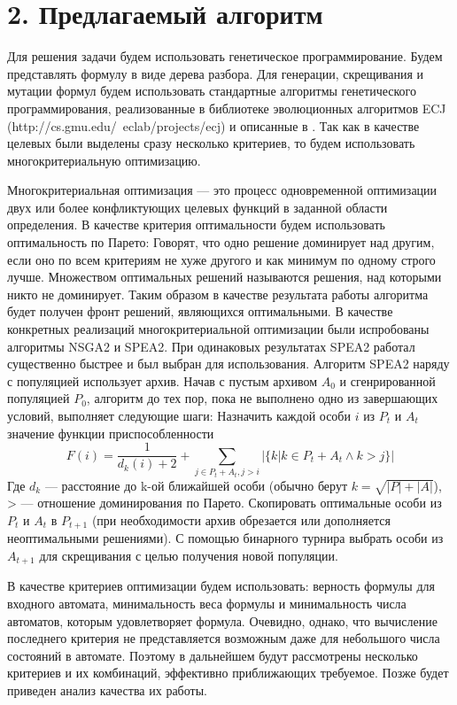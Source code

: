 \documentclass[12pt,fleqn]{article}
\begin{document}
\section{2. Предлагаемый алгоритм}

Для решения задачи будем использовать генетическое программирование\cite{kz1}. Будем представлять формулу в виде дерева разбора.
Для генерации, скрещивания и мутации формул будем использовать стандартные алгоритмы генетического программирования,
реализованные в библиотеке эволюционных алгоритмов ECJ (http://cs.gmu.edu/~eclab/projects/ecj) и описанные в \cite{kz1,kz2}.
Так как в качестве целевых были выделены сразу несколько критериев, то будем использовать многокритериальную оптимизацию.

Многокритериальная оптимизация --- это процесс одновременной оптимизации двух или более конфликтующих целевых функций
в заданной области определения. В качестве критерия оптимальности будем использовать оптимальность по Парето:
Говорят, что одно решение доминирует над другим, если оно по всем критериям не хуже другого и как минимум по одному
строго лучше. Множеством оптимальных решений называются решения, над которыми никто не доминирует. Таким образом
в качестве результата работы алгоритма будет получен фронт решений, являющихся оптимальными. В качестве конкретных
реализаций многокритериальной оптимизации были испробованы алгоритмы NSGA2\cite{nsga2} и SPEA2\cite{spea2}.
При одинаковых результатах SPEA2 работал существенно быстрее и был выбран для использования. Алгоритм SPEA2
наряду с популяцией использует архив. Начав с пустым архивом $A_0$ и сгенрированной популяцией $P_0$, алгоритм до
тех пор, пока не выполнено одно из завершающих условий, выполняет следующие шаги: Назначить каждой особи $i$ из $P_t$ и $A_t$
значение функции приспособленности
$$
F(i) = \frac{1}{d_k(i) + 2} + \sum_{j\in P_t + A_t, j > i}|\{k|k \in P_t + A_t \wedge k > j\}|
$$
Где $d_k$ --- расстояние до k-ой ближайшей особи (обычно берут $k = \sqrt{|P| + |A|}$), > --- отношение доминирования по Парето. Скопировать оптимальные
особи из $P_t$ и $A_t$ в $P_{t+1}$ (при необходимости архив обрезается или дополняется неоптимальными решениями).
С помощью бинарного турнира выбрать особи из $A_{t+1}$ для скрещивания с целью получения новой популяции. 

В качестве критериев оптимизации будем использовать: верность формулы для входного автомата, минимальность веса
формулы и минимальность числа автоматов, которым удовлетворяет формула. Очевидно, однако, что вычисление последнего
критерия не представляется возможным даже для небольшого числа состояний в автомате. Поэтому в дальнейшем будут
рассмотрены несколько критериев и их комбинаций, эффективно приближающих требуемое. Позже будет приведен
анализ качества их работы.
\end{document}

